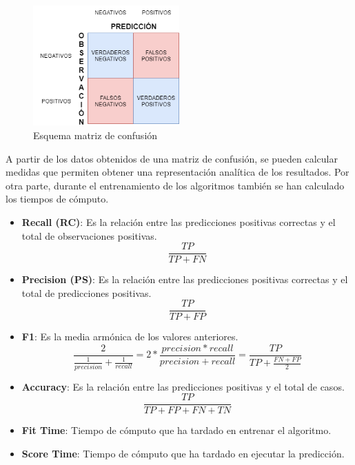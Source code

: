 \begin{figure}[H]
    \centering
    \includegraphics[width=0.5\textwidth, keepaspectratio]{imaxes/matriz_confusion.png}
    \caption{Esquema matriz de confusión}
    \label{fig:matrix_conf}
\end{figure}

A partir de los datos obtenidos de una matriz de confusión, se pueden calcular medidas que permiten obtener una representación analítica de los resultados. Por otra parte, durante el entrenamiento de los algoritmos también se han calculado los tiempos de cómputo.

\begin{itemize}
    \label{list:scores}
    \item\textbf{Recall (RC)}: Es la relación entre las predicciones positivas correctas y el total de observaciones positivas.
        \begin{equation}
            \frac{TP}{TP + FN}
        \end{equation}
    
    \item \textbf{Precision (PS)}: Es la relación entre las predicciones positivas correctas y el total de predicciones positivas.
        \begin{equation}
            \frac{TP}{TP  + FP}
        \end{equation}
    
    \item \textbf{F1}: Es la media armónica de los valores anteriores. 
        \begin{equation}
            \frac{2}{\frac{1}{precision} + \frac{1}{recall}} = 2 * \frac{precision * 
    recall}{precision + recall} = \frac{TP}{TP + \frac{FN + FP}{2}}
        \end{equation}
    
    \item \textbf{Accuracy}: Es la relación entre las predicciones positivas y el total de casos.
        \begin{equation}
            \frac{TP}{TP + FP + FN + TN} 
        \end{equation}
    
    
    \item \textbf{Fit Time}: Tiempo de cómputo que ha tardado en entrenar el algoritmo.
    
    \item \textbf{Score Time}: Tiempo de cómputo que ha tardado en ejecutar la predicción.
\end{itemize}

